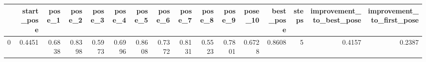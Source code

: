 \begin{tabular}{lrrrrrrrrrrrrrrr}
\toprule
{} &  start\_pose &  pose\_1 &  pose\_2 &  pose\_3 &  pose\_4 &  pose\_5 &  pose\_6 &  pose\_7 &  pose\_8 &  pose\_9 &  pose\_10 &  best\_pose &  steps &  improvement\_to\_best\_pose &  improvement\_to\_first\_pose \\
\midrule
0 &      0.4451 &  0.6838 &  0.8398 &  0.5973 &  0.6996 &  0.8608 &  0.7372 &  0.8131 &  0.5523 &  0.7801 &   0.6728 &     0.8608 &      5 &                    0.4157 &                     0.2387 \\
\bottomrule
\end{tabular}
